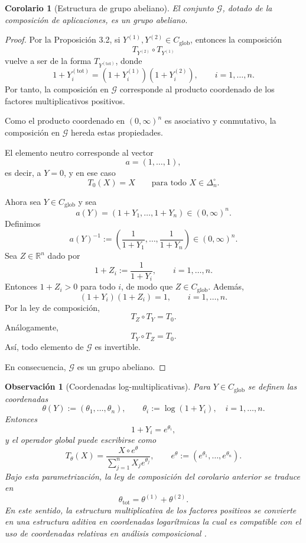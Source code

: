 \documentclass[12pt]{article}
\newtheorem{corolario}{Corolario}[section]
\newtheorem{observacion}{Observación}[section]
\begin{document}
\begin{corolario}[Estructura de grupo abeliano]
El conjunto $\mathcal G$, dotado de la composición de aplicaciones, es un grupo abeliano.
\end{corolario}

\begin{proof}
Por la Proposición 3.2, si $Y^{(1)},Y^{(2)}\in C_{\mathrm{glob}}$, entonces la composición
\[
T_{Y^{(2)}}\circ T_{Y^{(1)}}
\]
vuelve a ser de la forma $T_{Y^{(\mathrm{tot})}}$, donde
\[
1+Y_i^{(\mathrm{tot})}=(1+Y_i^{(1)})(1+Y_i^{(2)}),
\qquad i=1,\dots,n.
\]
Por tanto, la composición en $\mathcal G$ corresponde al producto coordenado de los factores multiplicativos positivos.

Como el producto coordenado en $(0,\infty)^n$ es asociativo y conmutativo, la composición en $\mathcal G$ hereda estas propiedades.

El elemento neutro corresponde al vector
\[
a=(1,\dots,1),
\]
es decir, a $Y=0$, y en ese caso
\[
T_0(X)=X
\qquad \text{para todo } X\in\Delta_n^\circ.
\]

Ahora sea $Y\in C_{\mathrm{glob}}$ y sea
\[
a(Y)=(1+Y_1,\dots,1+Y_n)\in(0,\infty)^n.
\]
Definimos
\[
a(Y)^{-1}
:=
\left(
\frac{1}{1+Y_1},\dots,\frac{1}{1+Y_n}
\right)\in(0,\infty)^n.
\]
Sea $Z\in\mathbb R^n$ dado por
\[
1+Z_i:=\frac{1}{1+Y_i},
\qquad i=1,\dots,n.
\]
Entonces $1+Z_i>0$ para todo $i$, de modo que $Z\in C_{\mathrm{glob}}$. Además,
\[
(1+Y_i)(1+Z_i)=1,
\qquad i=1,\dots,n.
\]
Por la ley de composición,
\[
T_Z\circ T_Y=T_0.
\]
Análogamente,
\[
T_Y\circ T_Z=T_0.
\]
Así, todo elemento de $\mathcal G$ es invertible.

En consecuencia, $\mathcal G$ es un grupo abeliano.
\end{proof}

\begin{observacion}[Coordenadas log-multiplicativas]\label{obs:coordenadasLog}
Para $Y\in C_{\mathrm{glob}}$ se definen las coordenadas
\[
\theta(Y) := (\theta_1,\dots,\theta_n), \qquad \theta_i := \log(1+Y_i), \quad i=1,\dots,n.
\]
Entonces
\[
1+Y_i=e^{\theta_i},
\]
y el operador global puede escribirse como
\[
T_\theta(X)
=
\frac{X\circ e^\theta}{\sum_{j=1}^n X_j e^{\theta_j}},
\qquad
e^\theta:=(e^{\theta_1},\dots,e^{\theta_n}).
\]
Bajo esta parametrización, la ley de composición del corolario anterior se traduce en
\[
\theta_{\mathrm{tot}}=\theta^{(1)}+\theta^{(2)}.
\]
En este sentido, la estructura multiplicativa de los factores positivos se convierte en una estructura aditiva en coordenadas logarítmicas la cual es compatible con el uso de coordenadas relativas en análisis composicional \citep{Aitchison1986}.
\end{observacion}
\end{document}
